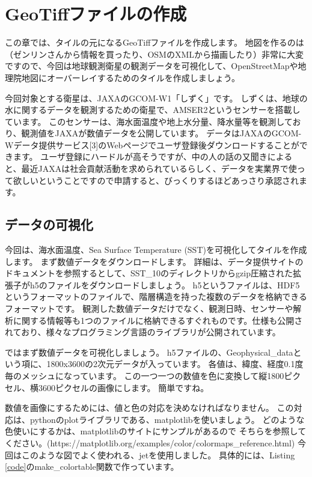 \chapter*{GeoTiffファイルの作成}

この章では、タイルの元になるGeoTiffファイルを作成します。
地図を作るのは（ゼンリンさんから情報を買ったり、OSMのXMLから描画したり）非常に大変ですので、今回は地球観測衛星の観測データを可視化して、OpenStreetMapや地理院地図にオーバーレイするためのタイルを作成しましょう。

今回対象とする衛星は、JAXAのGCOM-W1「しずく」です。
しずくは、地球の水に関するデータを観測するための衛星で、AMSER2というセンサーを搭載しています。
このセンサーは、海水面温度や地上水分量、降水量等を観測しており、観測値をJAXAが数値データを公開しています。
データはJAXAのGCOM-Wデータ提供サービス[3]のWebページでユーザ登録後ダウンロードすることができます。
ユーザ登録にハードルが高そうですが、中の人の話の又聞きによると、最近JAXAは社会貢献活動を求められているらしく、データを実業界で使って欲しいということですので申請すると、びっくりするほどあっさり承認されます。

\section*{データの可視化}
今回は、海水面温度、Sea Surface Temperature (SST)を可視化してタイルを作成します。
まず数値データをダウンロードします。
詳細は、データ提供サイトのドキュメントを参照するとして、SST\_10のディレクトリからgzip圧縮された拡張子がh5のファイルをダウンロードしましょう。
h5というファイルは、HDF5というフォーマットのファイルで、階層構造を持った複数のデータを格納できるフォーマットです。
観測した数値データだけでなく、観測日時、センサーや解析に関する情報等も1つのファイルに格納できるすぐれものです。仕様も公開されており、様々なプログラミング言語のライブラリが公開されています。

ではまず数値データを可視化しましょう。
h5ファイルの、Geophysical\_dataという項に、1800x3600の2次元データが入っています。
各値は、緯度、経度0.1度毎のメッシュになっています。
この一つ一つの数値を色に変換して縦1800ピクセル、横3600ピクセルの画像にします。
簡単ですね。

数値を画像にするためには、値と色の対応を決めなければなりません。
この対応は、pythonのplotライブラリである、matplotlibを使いましょう。
どのような色使いにするかは、matplotlibのサイトにサンプルがあるので
そちらを参照してください。(https://matplotlib.org/examples/color/colormaps\_reference.html) 今回はこのような図でよく使われる、jetを使用しました。
具体的には、Listing \ref{code}のmake\_colortable関数で作っています。


